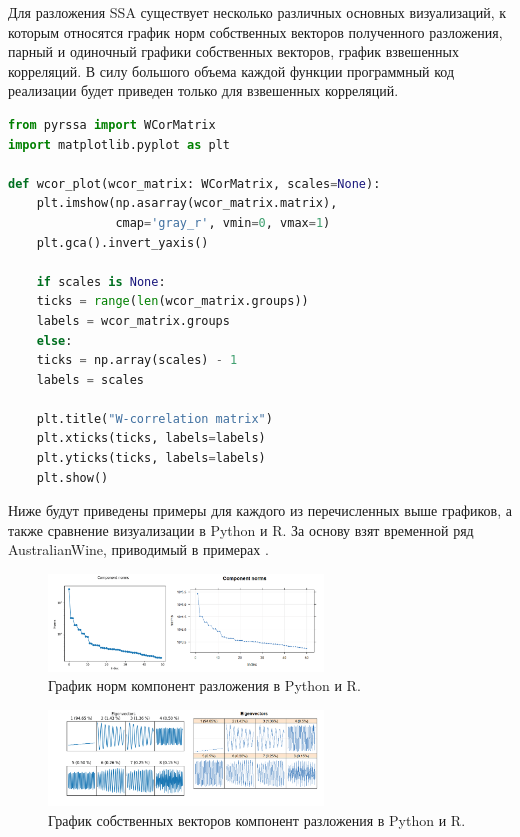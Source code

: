 \documentclass[specialist,
			   substylefile = spbu_report.rtx,
			   subf,href,colorlinks=true, 12pt]{disser}
\begin{document}
Для разложения SSA существует несколько различных основных визуализаций, к которым относятся график норм собственных векторов полученного разложения, парный и одиночный графики собственных векторов, график взвешенных корреляций. В силу большого объема каждой функции программный код реализации будет приведен только для взвешенных корреляций.

\noindent
\begin{minipage}{\linewidth}
\begin{lstlisting}[language=Python, caption=Визуализация взвешенных корреляций с помощью matplotlib.]
from pyrssa import WCorMatrix	
import matplotlib.pyplot as plt
	
def wcor_plot(wcor_matrix: WCorMatrix, scales=None):
	plt.imshow(np.asarray(wcor_matrix.matrix), 
			   cmap='gray_r', vmin=0, vmax=1)
	plt.gca().invert_yaxis()
	
	if scales is None:
	ticks = range(len(wcor_matrix.groups))
	labels = wcor_matrix.groups
	else:
	ticks = np.array(scales) - 1
	labels = scales
	
	plt.title("W-correlation matrix")
	plt.xticks(ticks, labels=labels)
	plt.yticks(ticks, labels=labels)
	plt.show()
\end{lstlisting}
\end{minipage}

Ниже будут приведены примеры для каждого из перечисленных выше графиков, а также сравнение визуализации в Python и R. За основу взят временной ряд AustralianWine, приводимый в примерах \cite{rssa-book}. 


\begin{figure}[htp]
	\centering
	\includegraphics[width=0.65\textwidth]{rpy_norms}
	\caption{График норм компонент разложения в Python и R.}
	\label{fig:rpy_norms}
\end{figure}

\begin{figure}[htp]
	\centering
	\includegraphics[width=0.65\textwidth]{rpy_vectors}
	\caption{График собственных векторов компонент разложения в Python и R.}
	\label{fig:rpy_vectors}
\end{figure}
\end{document}
